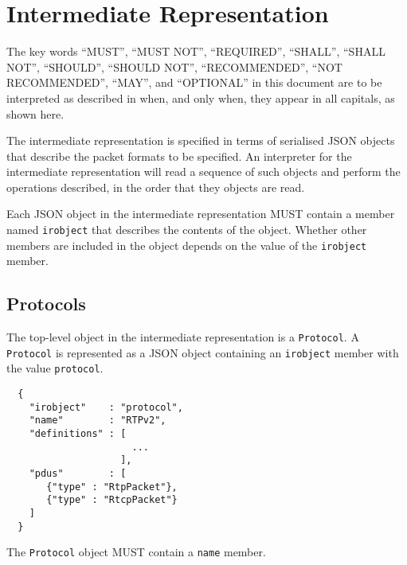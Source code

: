 \documentclass[10pt,twocolumn,a4paper]{article}
\begin{document}


\section{Intermediate Representation}

The key words ``MUST'', ``MUST NOT'', ``REQUIRED'', ``SHALL'', ``SHALL
NOT'', ``SHOULD'', ``SHOULD NOT'', ``RECOMMENDED'', ``NOT RECOMMENDED'',
``MAY'', and ``OPTIONAL'' in this document are to be interpreted as
described in \cite{RFC2119,RFC8174} when, and only when, they appear
in all capitals, as shown here.



The intermediate representation is specified in terms of serialised JSON
\cite{RFC7159} objects that describe the packet formats to be specified.
An interpreter for the intermediate representation will read a sequence of
such objects and perform the operations described, in the order that they
objects are read.

Each JSON object in the intermediate representation MUST contain a member
named \texttt{irobject} that describes the contents of the object.
Whether other members are included in the object depends on the value of
the \texttt{irobject} member.

\subsection{Protocols}

The top-level object in the intermediate representation is a
\texttt{Protocol}. A \texttt{Protocol} is represented as a JSON object
containing an \texttt{irobject} member with the value \texttt{protocol}.

\begin{verbatim}
  {
    "irobject"    : "protocol",
    "name"        : "RTPv2",
    "definitions" : [
                      ...
                    ],
    "pdus"        : [
       {"type" : "RtpPacket"},
       {"type" : "RtcpPacket"}
    ]
  }
\end{verbatim}

The \texttt{Protocol} object MUST contain a \texttt{name} member.
\end{document}

